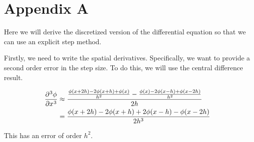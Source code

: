 \section*{Appendix A}\label{sec:appendixA}
%
%
%

Here we will derive the discretized version of the differential equation so that we can use an explicit step method.

Firstly, we need to write the spatial derivatives. Specifically, we want to provide a second order error in the step size. To do this, we will use the central difference result.

\begin{align*}
  \diffp[3]{\phi}{x} &\approx \frac{\frac{\phi(x+2h) - 2 \phi (x+h) + \phi (x)}{h^2} - \frac{\phi(x) - 2 \phi(x-h) + \phi(x-2h)}{h^2}}{2h}\\
                     &= \frac{\phi(x+2h) - 2 \phi(x+h) + 2\phi(x-h) - \phi(x-2h)}{2h^3}
\end{align*}

This has an error of order $h^2$.
